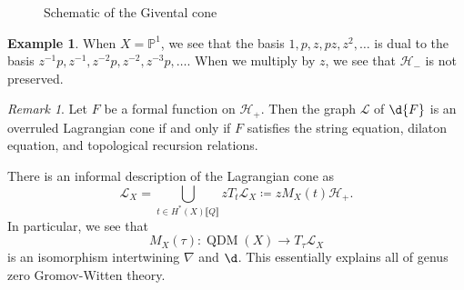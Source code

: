 \documentclass{amsart}
\theoremstyle{definition}
\newtheorem{exm}[thm]{Example}
\theoremstyle{remark}
\newtheorem{rmk}[thm]{Remark}
\theoremstyle{plain}
\theoremstyle{definition}
\theoremstyle{remark}
\renewcommand{\P}{\mathbb{P}}
\renewcommand{\mc}[1]{\mathcal{#1}}
\newcommand{\1}{\mathbf{1}}
\newcommand{\2}{\mathbf{2}}
\newcommand{\3}{\mathbf{3}}
\newcommand{\ps}[1]{\lBrack #1 \rBrack}
\DeclareMathOperator{\QDM}{QDM}
\begin{document}
\begin{figure}[H]
    \caption{Schematic of the Givental cone}
\end{figure}

\begin{exm}
    When \(X = \P^1\), we see that the basis \(1, p, z, pz, z^2, \ldots\) is dual to the basis \(z^{-1}p, z^{-1}, z^{-2}p, z^{-2}, z^{-3}p, \ldots\). When we multiply by \(z\), we see that \(\mc{H}_-\) is not preserved.
\end{exm}

\begin{rmk}
    Let \(F\) be a formal function on \(\mc{H}_+\). Then the graph \(\mc{L}\) of \(\d{F}\) is an overruled Lagrangian cone if and only if \(F\) satisfies the string equation, dilaton equation, and topological recursion relations.
\end{rmk}

There is an informal description of the Lagrangian cone as
\[ \mc{L}_X = \bigcup_{t \in H^*(X)\ps{Q}} z T_t \mc{L}_X \coloneqq z M_X(t) \mc{H}_+. \]
In particular, we see that
\[ M_X(\tau) \colon \QDM(X) \to T_{\tau} \mc{L}_X \]
is an isomorphism intertwining \(\nabla\) and \(\d\). This essentially explains all of genus zero Gromov-Witten theory.
\end{document}
